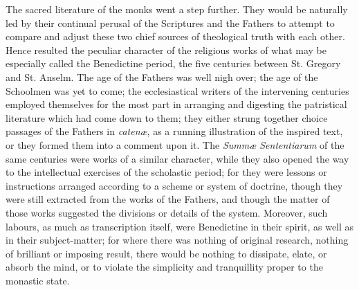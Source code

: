 The sacred literature of the monks went a step further. They would
be naturally led by their continual perusal of the Scriptures and the
Fathers to attempt to compare and adjust these two chief sources of
theological truth with each other. Hence resulted the peculiar
character of the religious works of what may be especially called the
Benedictine period, the five centuries between St. Gregory and St.
Anselm. The age of the Fathers was well nigh over; the age of the
Schoolmen was yet to come; the ecclesiastical writers of the
intervening centuries employed themselves for the most part in
arranging and digesting the patristical literature which had come down
to them; they either strung together choice passages of the Fathers in
\emph{catenæ}, as a running illustration of the inspired text, or
they formed them into a comment upon it. The \emph{Summæ Sententiarum}
of the same centuries were works of a similar character, while they
also opened the way to the intellectual exercises of the scholastic
period; for they were lessons or instructions arranged according to a
scheme or system of doctrine, though they were still extracted from
the works of the Fathers, and though the matter of those works
suggested the divisions or details of the system. Moreover, such
labours, as much as transcription itself, were Benedictine in their
spirit, as well as in their subject-matter; for where there was
nothing of original research, nothing of brilliant or imposing result,
there would be nothing to dissipate, elate, or absorb the mind, or to
violate the simplicity and tranquillity proper to the monastic state.

